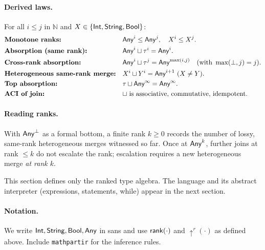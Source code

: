 \paragraph{Derived laws.}
For all $i\le j$ in $\mathbb{N}$ and $X\in\{\mathsf{Int},\mathsf{String},\mathsf{Bool}\}$:
\begin{align*}
&\textbf{Monotone ranks:} && \mathsf{Any}^{i} \le \mathsf{Any}^{j},\quad X^{i} \le X^{j}.\\
&\textbf{Absorption (same rank):} && \mathsf{Any}^{i} \sqcup \tau^{i} = \mathsf{Any}^{i}.\\
&\textbf{Cross-rank absorption:} && \mathsf{Any}^{i} \sqcup \tau^{j} = \mathsf{Any}^{\max(i,j)}\quad(\text{with }\max(\bot,j)=j).\\
&\textbf{Heterogeneous same-rank merge:} && X^{i} \sqcup Y^{i}=\mathsf{Any}^{i+1}\ (X\neq Y).\\
&\textbf{Top absorption:} && \tau \sqcup \mathsf{Any}^{\infty}=\mathsf{Any}^{\infty}.\\
&\textbf{ACI of join:} && \text{$\sqcup$ is associative, commutative, idempotent.}
\end{align*}

\paragraph{Reading ranks.}
With $\mathsf{Any}^{\bot}$ as a formal bottom, a finite rank $k\ge 0$ records the number of lossy, same-rank heterogeneous merges witnessed so far.
Once at $\mathsf{Any}^{k}$, further joins at rank $\le k$ do not escalate the rank; escalation requires a new heterogeneous merge \emph{at rank $k$}.

\medskip
This section defines only the ranked type algebra.
The language and its abstract interpreter (expressions, statements, \textsf{while}) appear in the next section.

\paragraph*{Notation.}
We write $\mathsf{Int},\mathsf{String},\mathsf{Bool},\mathsf{Any}$ in \textsf{sans} and use
$\mathsf{rank}(\cdot)$ and $\uparrow^{r}(\cdot)$ as defined above.
Include \texttt{mathpartir} for the inference rules.
